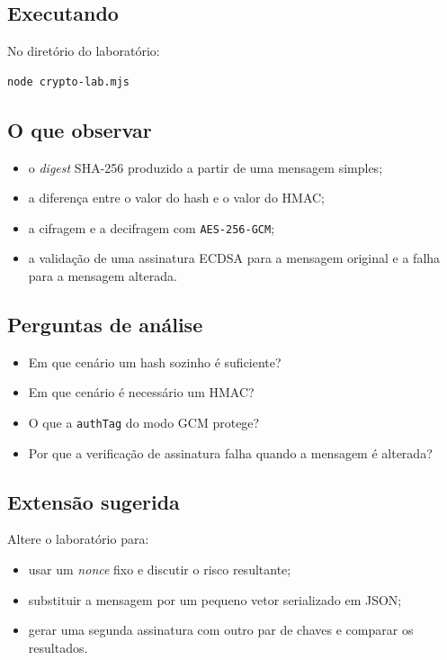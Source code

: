 \subsection{Executando}
No diretório do laboratório:
\begin{verbatim}
node crypto-lab.mjs
\end{verbatim}

\subsection{O que observar}
\begin{itemize}[leftmargin=*]
  \item o \textit{digest} SHA-256 produzido a partir de uma mensagem simples;
  \item a diferença entre o valor do hash e o valor do HMAC;
  \item a cifragem e a decifragem com \texttt{AES-256-GCM};
  \item a validação de uma assinatura ECDSA para a mensagem original e a falha para a mensagem alterada.
\end{itemize}

\subsection{Perguntas de análise}
\begin{itemize}[leftmargin=*]
  \item Em que cenário um hash sozinho é suficiente?
  \item Em que cenário é necessário um HMAC?
  \item O que a \texttt{authTag} do modo GCM protege?
  \item Por que a verificação de assinatura falha quando a mensagem é alterada?
\end{itemize}

\subsection{Extensão sugerida}
Altere o laboratório para:
\begin{itemize}[leftmargin=*]
  \item usar um \textit{nonce} fixo e discutir o risco resultante;
  \item substituir a mensagem por um pequeno vetor serializado em JSON;
  \item gerar uma segunda assinatura com outro par de chaves e comparar os resultados.
\end{itemize}

